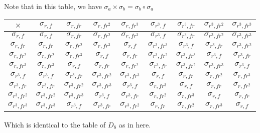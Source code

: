 \documentclass{report}
\begin{document}
{    Note that in this table, we have $\sigma_a \times \sigma_b = \sigma_b \circ \sigma_a$

    \begin{tabular}{|c|c c c c c c c c|}
      \hline
      $\times $&$ \sigma_{r, f} $&$\sigma_{r, fr} $&$\sigma_{r,fr^2}$&$\sigma_{r,fr^3}$&$\sigma_{r^3, f}$&$\sigma_{r^3, fr}$&$\sigma_{r^3, fr^2}$&$\sigma_{r^3, fr^3} $\\ 
      \hline
      $\sigma_{r, f}    $&$ \sigma_{r, f} $&$\sigma_{r, fr}$&$\sigma_{r,fr^2}$&$\sigma_{r,fr^3}   $&$\sigma_{r^3, f}$&$\sigma_{r^3, fr}$&$\sigma_{r^3, fr^2}$&$\sigma_{r^3, fr^3}$\\ 
      $\sigma_{r, fr}   $&$\sigma_{r, fr}$&$\sigma_{r,fr^2}$&$\sigma_{r,fr^3}$&$ \sigma_{r, f}    $&$\sigma_{r^3, fr^3}$&$\sigma_{r^3, f}$&$\sigma_{r^3, fr}$&$\sigma_{r^3, fr^2}$\\     
      $\sigma_{r,fr^2}  $&$\sigma_{r,fr^2}$&$\sigma_{r,fr^3}$&$ \sigma_{r, f} $&$\sigma_{r, fr}   $&$\sigma_{r^3, fr^2}$&$\sigma_{r^3, fr^3}$&$\sigma_{r^3, f}$&$\sigma_{r^3, fr}$\\ 
      $\sigma_{r,fr^3}  $&$\sigma_{r,fr^3}$&$ \sigma_{r, f} $&$\sigma_{r, fr}$&$\sigma_{r,fr^2}   $&$\sigma_{r^3, fr}$&$\sigma_{r^3, fr^2}$&$\sigma_{r^3, fr^3}$&$\sigma_{r^3, f}$\\ 
      $\sigma_{r^3, f}    $&$\sigma_{r^3, f}$&$\sigma_{r^3, fr}$&$\sigma_{r^3, fr^2}$&$\sigma_{r^3, fr^3}$&$ \sigma_{r, f} $&$\sigma_{r, fr}$&$\sigma_{r,fr^2}$&$\sigma_{r,fr^3}   $\\
      $\sigma_{r^3, fr}   $&$\sigma_{r^3, fr}$&$\sigma_{r^3, fr^2}$&$\sigma_{r^3, fr^3}$&$\sigma_{r^3, f}$&$\sigma_{r,fr^3}$&$ \sigma_{r, f} $&$\sigma_{r, fr}$&$\sigma_{r,fr^2}   $\\ 
      $\sigma_{r^3, fr^2} $&$\sigma_{r^3, fr^2}$&$\sigma_{r^3, fr^3}$&$\sigma_{r^3, f}$&$\sigma_{r^3, fr}$&$\sigma_{r,fr^2}$&$\sigma_{r,fr^3}$&$ \sigma_{r, f} $&$\sigma_{r, fr}   $\\
      $\sigma_{r^3, fr^3} $&$\sigma_{r^3, fr^3}$&$\sigma_{r^3, f}$&$\sigma_{r^3, fr}$&$\sigma_{r^3, fr^2}$&$\sigma_{r, fr}$&$\sigma_{r,fr^2}$&$\sigma_{r,fr^3}$&$ \sigma_{r, f}    $\\ 
      \hline
    \end{tabular}

    Which is identical to the table of $D_8$ as in here.

}
\end{document}
